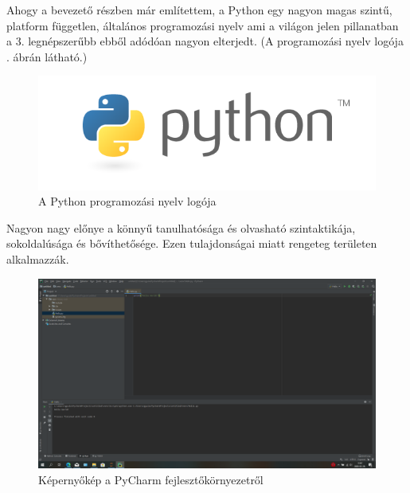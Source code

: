 


Ahogy a bevezető részben már említettem, a Python egy nagyon magas
szintű, platform független, általános programozási nyelv ami a világon
jelen pillanatban a 3. legnépszerűbb \cite{tiobe}
ebből adódóan nagyon elterjedt.
(A programozási nyelv logója . ábrán látható.)

\begin{figure}
\centering
\includegraphics[width=\textwidth]{img/python-logo.png}
\caption{A Python programozási nyelv logója \cite{python}}
\label{fig:python-logo}
\end{figure}

Nagyon nagy előnye a könnyű tanulhatósága és olvasható szintaktikája,
sokoldalúsága és bővíthetősége. Ezen tulajdonságai miatt rengeteg
területen alkalmazzák.

\begin{figure}
\centering
\includegraphics[width=\textwidth]{img/Python_screenshot.png}
\caption{Képernyőkép a PyCharm fejlesztőkörnyezetről}
\label{fig:pycharm}
\end{figure}

